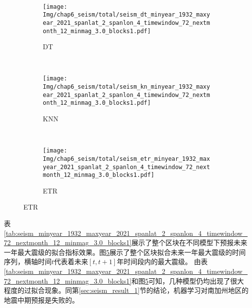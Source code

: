 \begin{figure}[!htbp]
\begin{subfigure}[b]{0.45\textwidth}
    \vspace{-1cm}
    \label{fig:seism_gbr_minyear_1932_maxyear_2021_spanlat_2_spanlon_4_timewindow_72_nextmonth_12_minmag_3.0_blocks1}
  \end{subfigure}
  ~
  \begin{subfigure}[b]{0.45\textwidth}
    \caption{DT}
    \vspace{-0.2cm}
    \texttt{[image: Img/chap6\_seism/total/seism\_dt\_minyear\_1932\_maxyear\_2021\_spanlat\_2\_spanlon\_4\_timewindow\_72\_nextmonth\_12\_minmag\_3.0\_blocks1.pdf]}
    \vspace{-1cm}
    \label{fig:seism_dt_minyear_1932_maxyear_2021_spanlat_2_spanlon_4_timewindow_72_nextmonth_12_minmag_3.0_blocks1}
  \end{subfigure}
  \\
  \begin{subfigure}[b]{0.45\textwidth}
    \caption{KNN}
    \vspace{-0.2cm}
    \texttt{[image: Img/chap6\_seism/total/seism\_kn\_minyear\_1932\_maxyear\_2021\_spanlat\_2\_spanlon\_4\_timewindow\_72\_nextmonth\_12\_minmag\_3.0\_blocks1.pdf]}
    \vspace{-1cm}
    \label{fig:seism_knn_minyear_1932_maxyear_2021_spanlat_2_spanlon_4_timewindow_72_nextmonth_12_minmag_3.0_blocks1}
  \end{subfigure}
  ~
  \begin{subfigure}[b]{0.45\textwidth}
    \caption{ETR}
    \vspace{-0.2cm}
    \texttt{[image: Img/chap6\_seism/total/seism\_etr\_minyear\_1932\_maxyear\_2021\_spanlat\_2\_spanlon\_4\_timewindow\_72\_nextmonth\_12\_minmag\_3.0\_blocks1.pdf]}
    \vspace{-1cm}
    \label{fig:seism_etr_minyear_1932_maxyear_2021_spanlat_2_spanlon_4_timewindow_72_nextmonth_12_minmag_3.0_blocks1}
  \end{subfigure}
  \label{fig:seism_minyear_1932_maxyear_2021_spanlat_2_spanlon_4_timewindow_72_nextmonth_12_minmag_3.0_blocks1}
\end{figure}

表\ref{tab:seism_minyear_1932_maxyear_2021_spanlat_2_spanlon_4_timewindow_72_nextmonth_12_minmag_3.0_blocks1}展示了整个区块在不同模型下预报未来一年最大震级的拟合指标效果。图\ref{fig:seism_minyear_1932_maxyear_2021_spanlat_2_spanlon_4_timewindow_72_nextmonth_12_minmag_3.0_blocks1}展示了整个区块拟合未来一年最大震级的时间序列，横轴时间$t$代表着未来$[t,t+1]$年时间段内的最大震级。
由表\ref{tab:seism_minyear_1932_maxyear_2021_spanlat_2_spanlon_4_timewindow_72_nextmonth_12_minmag_3.0_blocks1}和图\ref{fig:seism_minyear_1932_maxyear_2021_spanlat_2_spanlon_4_timewindow_72_nextmonth_12_minmag_3.0_blocks1}可知，几种模型仍均出现了很大程度的过拟合现象。同第\ref{sec:seism_result_1}节的结论，机器学习对南加州地区的地震中期预报是失败的。


